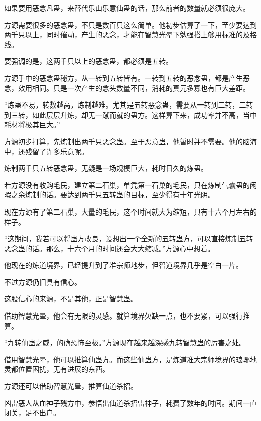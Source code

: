 
\begin{this_body}



如果要用恶念凡蛊，来替代乐山乐意仙蛊的话，那么前者的数量就必须很庞大。

方源需要很多的恶念蛊，不只是数百只这么简单。他初步估算了一下，至少要达到两千只以上，同时催动，产生的恶念，才能在智慧光晕下勉强搭上够用标准的及格线。

要强调的是，这两千只以上的恶念蛊，都必须是五转。

方源手中的恶念蛊秘方，从一转到五转皆有。一转到五转的恶念蛊，都是产生恶念，效用相同。只是一次产生的念头数量不同，消耗的真元多寡也有巨大差距。

“炼蛊不易，转数越高，炼制越难。尤其是五转恶念蛊，需要从一转到二转，二转到三转，如此层层升炼，却无一蹴而就的蛊方。这样算下来，成功率并不高，当中耗材将极其巨大。”

方源初步打算，先炼制出两千只恶念蛊。至于恶意蛊，他暂时并不需要。他的脑海中，还残留了许多乐意呢。

炼制两千只五转恶念蛊，无疑是一场规模巨大，耗时日久的炼蛊。

若方源没有收购毛民，建立第二石巢，单凭第一石巢的毛民，只在炼制气囊蛊的闲暇之余炼制的话。要达到两千只五转蛊的目标，至少得有十年光阴。

现在方源有了第二石巢，大量的毛民，这个时间就大为缩短，只有十六个月左右的样子。

“这期间，我若可以将蛊方改良，设想出一个全新的五转蛊方，可以直接炼制五转恶念蛊的话。那么，十六个月的时间还会大大缩减。”方源心中想着。

他现在的炼道境界，已经提升到了准宗师地步，但智道境界几乎是空白一片。

不过方源仍旧具有信心。

这股信心的来源，不是其他，正是智慧蛊。

借助智慧光晕，他会有无限的灵感。就算境界欠缺一点，也不要紧，可以强行推算。

“九转仙蛊之威，的确恐怖至极。”方源现在越来越深感九转智慧蛊的厉害之处。

借用智慧光晕，他可以推算仙蛊方。而这些仙蛊方，是炼道准大宗师境界的琅琊地灵都位置困扰，无有进展的东西。

方源还可以借助智慧光晕，推算仙道杀招。

凶雷恶人从血神子残方中，参悟出仙道杀招雷神子，耗费了数年的时间。期间一直闭关，足不出户。


\end{this_body}
